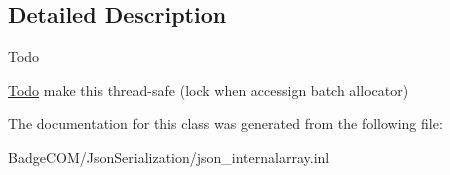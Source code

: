 \subsection{Detailed Description}
\begin{DoxyRefDesc}{Todo}
\item[\hyperlink{todo__todo000001}{Todo}]make this thread-\/safe (lock when accessign batch allocator) \end{DoxyRefDesc}


The documentation for this class was generated from the following file\-:\begin{DoxyCompactItemize}
\item 
Badge\-C\-O\-M/\-Json\-Serialization/json\-\_\-internalarray.\-inl\end{DoxyCompactItemize}

